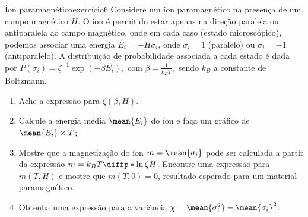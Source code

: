 \begin{exercício}{Íon paramagnético}{exercício6}
    Considere um íon paramagnético na presença de um campo magnético \(H\). O íon é permitido estar apenas na direção paralela ou antiparalela ao campo magnético, onde em cada caso (estado microscópico), podemos associar uma energia \(E_i = -H \sigma_i\), onde \(\sigma_i = 1\) (paralelo) ou \(\sigma_i = -1\) (antiparalelo). A distribuição de probabilidade associada a cada estado é dada por \(P(\sigma_i) = \zeta^{-1} \exp(-\beta E_i),\) com \(\beta = \frac{1}{k_BT},\) sendo \(k_B\) a constante de Boltzmann.
    \begin{enumerate}[label=(\alph*)]
        \item Ache a expressão para \(\zeta(\beta, H)\).
        \item Calcule a energia média \(\mean{E_i}\) do íon e faça um gráfico de \(\mean{E_i} \times T\);
        \item Mostre que a magnetização do íon \(m = \mean{\sigma_i}\) pode ser calculada a partir da expressão \(m = k_B T \diffp*{\ln \zeta}{H}\). Encontre uma expressão para \(m(T, H)\) e mostre que \(m(T, 0) = 0\), resultado esperado para um material paramagnético.
        \item Obtenha uma expressão para a variância \(\chi = \mean{\sigma_i^2} - \mean{\sigma_i}^2\).
    \end{enumerate}
\end{exercício}
